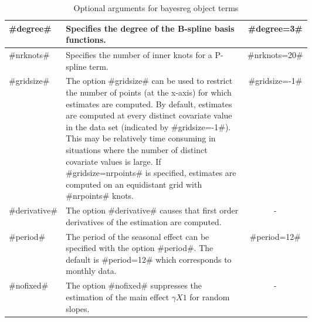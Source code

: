 \begin{table}[ht]
\begin{tabular}{|l|p{0.6\linewidth}|c|}

#degree# & Specifies the degree of the B-spline basis functions. &
#degree=3# \\ \hline

#nrknots# & Specifies the number of inner knots for a P-spline
term. & #nrknots=20# \\ \hline

#gridsize# & The option #gridsize# can be used to restrict the
number of points (at the x-axis) for which estimates are computed.
By default, estimates are computed at every distinct covariate
value in the data set (indicated by #gridsize=-1#). This may be
relatively time consuming in situations where the number of
distinct covariate values is large. If #gridsize=nrpoints# is
specified, estimates are computed
on an equidistant grid with #nrpoints# knots. & #gridsize=-1# \\
\hline

#derivative# & The option #derivative# causes that first order
derivatives of the estimation are computed. & - \\ \hline

#period# & The period of the seasonal effect can be specified with
the option #period#. The default is #period=12# which corresponds
to monthly data. & #period=12# \\ \hline

#nofixed# & The option #nofixed# suppresses the estimation of the
main effect $\gamma X1$ for random slopes. & - \\ \hline

\end{tabular}
{\em\caption{\label{options} Optional arguments for bayesreg
object terms}}
\end{table}


